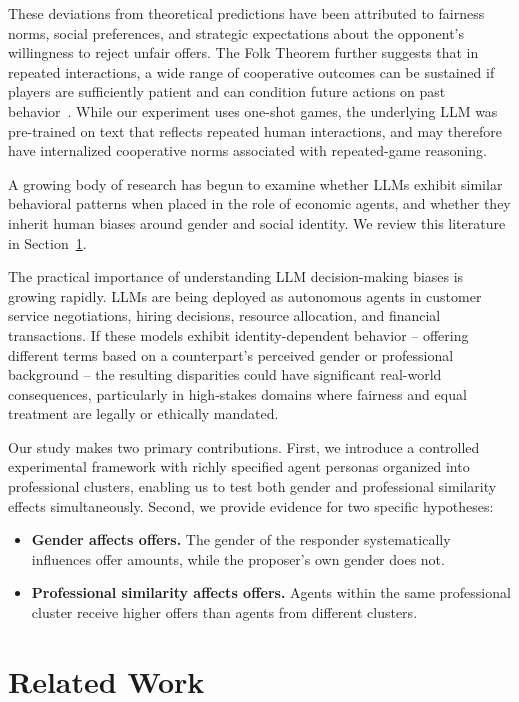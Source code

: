 \documentclass[12pt]{article}
\begin{document}
These deviations from theoretical predictions have been attributed to fairness norms, social preferences, and strategic expectations about the opponent's willingness to reject unfair offers. The Folk Theorem further suggests that in repeated interactions, a wide range of cooperative outcomes can be sustained if players are sufficiently patient and can condition future actions on past behavior~\cite{aumann1959,friedman1971}. While our experiment uses one-shot games, the underlying LLM was pre-trained on text that reflects repeated human interactions, and may therefore have internalized cooperative norms associated with repeated-game reasoning.

A growing body of research has begun to examine whether LLMs exhibit similar behavioral patterns when placed in the role of economic agents, and whether they inherit human biases around gender and social identity. We review this literature in Section~\ref{sec:related}.

The practical importance of understanding LLM decision-making biases is growing rapidly. LLMs are being deployed as autonomous agents in customer service negotiations, hiring decisions, resource allocation, and financial transactions. If these models exhibit identity-dependent behavior -- offering different terms based on a counterpart's perceived gender or professional background -- the resulting disparities could have significant real-world consequences, particularly in high-stakes domains where fairness and equal treatment are legally or ethically mandated.

Our study makes two primary contributions. First, we introduce a controlled experimental framework with richly specified agent personas organized into professional clusters, enabling us to test both gender and professional similarity effects simultaneously. Second, we provide evidence for two specific hypotheses:

\begin{itemize}
    \item[\textbf{H1}:] \textbf{Gender affects offers.} The gender of the responder systematically influences offer amounts, while the proposer's own gender does not.
    \item[\textbf{H2}:] \textbf{Professional similarity affects offers.} Agents within the same professional cluster receive higher offers than agents from different clusters.
\end{itemize}

\section{Related Work}
\label{sec:related}
\end{document}

